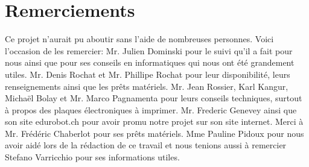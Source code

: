 \documentclass[a4paper,11pt]{report}
\begin{document}
{%

\clearpage

\section*{Remerciements}
Ce projet n'aurait pu aboutir sans l'aide de nombreuses personnes. Voici l'occasion de les remercier:  Mr. Julien Dominski pour le suivi qu'il a fait pour nous ainsi que pour ses conseils en informatiques qui nous ont été grandement utiles. Mr. Denis Rochat et Mr. Phillipe Rochat pour leur disponibilité, leurs renseignements ainsi que les prêts matériels. Mr. Jean Rossier, Karl Kangur, Michaël Bolay et Mr. Marco Pagnamenta pour leurs conseils techniques, surtout à propos des plaques électroniques à imprimer. Mr. Frederic Genevey ainsi que son site edurobot.ch pour avoir promu notre projet sur son site internet. Merci à Mr. Frédéric Chaberlot pour ses prêts matériels. Mme Pauline Pidoux pour nous avoir aidé lors de la rédaction de ce travail et nous tenions aussi à remercier Stefano Varricchio pour ses informations utiles.

\clearpage

\begin{abstract}


\end{abstract}}
\end{document}
